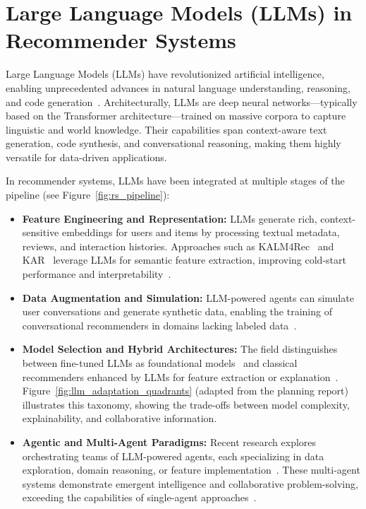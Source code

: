 
\section{Large Language Models (LLMs) in Recommender Systems}
Large Language Models (LLMs) have revolutionized artificial intelligence, enabling unprecedented advances in natural language understanding, reasoning, and code generation~\cite{Touvron2023LLaMA,Wang2023LLMAgentsSurvey}. Architecturally, LLMs are deep neural networks—typically based on the Transformer architecture—trained on massive corpora to capture linguistic and world knowledge. Their capabilities span context-aware text generation, code synthesis, and conversational reasoning, making them highly versatile for data-driven applications.

In recommender systems, LLMs have been integrated at multiple stages of the pipeline (see Figure~\ref{fig:rs_pipeline}):
\begin{itemize}
    \item \textbf{Feature Engineering and Representation:} LLMs generate rich, context-sensitive embeddings for users and items by processing textual metadata, reviews, and interaction histories. Approaches such as KALM4Rec~\cite{KALM4Rec} and KAR~\cite{KAR} leverage LLMs for semantic feature extraction, improving cold-start performance and interpretability~\cite{Planning_Report}.
    \item \textbf{Data Augmentation and Simulation:} LLM-powered agents can simulate user conversations and generate synthetic data, enabling the training of conversational recommenders in domains lacking labeled data~\cite{Ramos2024Synthetic,Planning_Report}.
    \item \textbf{Model Selection and Hybrid Architectures:} The field distinguishes between fine-tuned LLMs as foundational models~\cite{Cao2023SequentialRec,Ramos2024UPR} and classical recommenders enhanced by LLMs for feature extraction or explanation~\cite{U-BERT}. Figure~\ref{fig:llm_adaptation_quadrants} (adapted from the planning report) illustrates this taxonomy, showing the trade-offs between model complexity, explainability, and collaborative information.
    \item \textbf{Agentic and Multi-Agent Paradigms:} Recent research explores orchestrating teams of LLM-powered agents, each specializing in data exploration, domain reasoning, or feature implementation~\cite{Wang2024RecMind,MACRec}. These multi-agent systems demonstrate emergent intelligence and collaborative problem-solving, exceeding the capabilities of single-agent approaches~\cite{litterature_review}.
\end{itemize}

